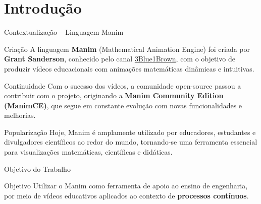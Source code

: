 \section{Introdução}

\begin{frame}{Contextualização – Linguagem Manim}

\begin{block}{\faUser \quad Criação}
A linguagem \textbf{Manim} (Mathematical Animation Engine) foi criada por \textbf{Grant Sanderson}, conhecido pelo canal \href{https://www.youtube.com/@3blue1brown}{3Blue1Brown}, com o objetivo de produzir vídeos educacionais com animações matemáticas dinâmicas e intuitivas.
\end{block}

\begin{block}{\faUsers \quad Continuidade}
Com o sucesso dos vídeos, a comunidade open-source passou a contribuir com o projeto, originando a \textbf{Manim Community Edition (ManimCE)}, que segue em constante evolução com novas funcionalidades e melhorias.
\end{block}

\begin{block}{\faRocket \quad Popularização}
Hoje, Manim é amplamente utilizado por educadores, estudantes e divulgadores científicos ao redor do mundo, tornando-se uma ferramenta essencial para visualizações matemáticas, científicas e didáticas.
\end{block}

\end{frame}

\begin{frame}{Objetivo do Trabalho}

\begin{block}{\faBullseye \quad Objetivo}
Utilizar o Manim como ferramenta de apoio ao ensino de engenharia, por meio de vídeos educativos aplicados ao contexto de \textbf{processos contínuos}.
\end{block}

\end{frame}